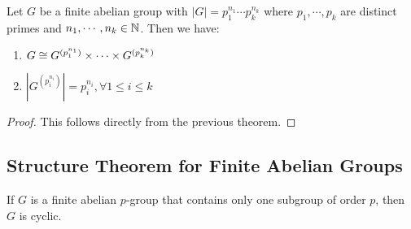 \documentclass[11pt]{article}
\begin{document}
\begin{theorem}
    Let $G$ be a finite abelian group with $|G|=p_1^{n_1}\cdots p_k^{n_k}$ where $p_1,\cdots,p_k$ are distinct primes and $n_1,\cdots,n_k\in\mathbb{N}$. Then we have:
    \begin{enumerate}
        \item $G\cong G^{(p_1^{n_1})}\times\cdots\times G^{(p_k^{n_k})}$
        \item $|G^{(p_i^{n_i})}|=p_i^{n_i},\forall 1\leq i\leq k$
    \end{enumerate}
\end{theorem}

\begin{proof}
     This follows directly from the previous theorem.
\end{proof}

\subsection{Structure Theorem for Finite Abelian Groups}

\begin{proposition}
    If $G$ is a finite abelian $p$-group that contains only one subgroup of order $p$, then $G$ is cyclic.
\end{proposition}
\end{document}
